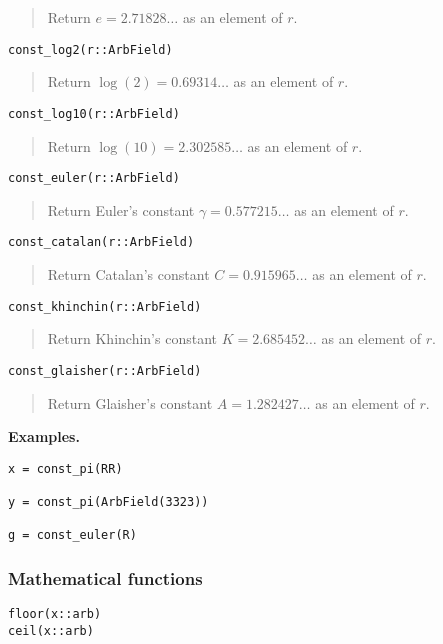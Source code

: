 \documentclass[a4paper,10pt]{article}
\newcommand{\desc}[1]{\vspace{-3mm}\begin{quote}#1\end{quote}}
\begin{document}
{{\desc{Return $e = 2.71828\ldots$ as an element of $r$.}

\begin{lstlisting}
const_log2(r::ArbField)
\end{lstlisting}

\desc{Return $\log(2) = 0.69314\ldots$ as an element of $r$.}

\begin{lstlisting}
const_log10(r::ArbField)
\end{lstlisting}

\desc{Return $\log(10) = 2.302585\ldots$ as an element of $r$.}

\begin{lstlisting}
const_euler(r::ArbField)
\end{lstlisting}

\desc{Return Euler's constant $\gamma = 0.577215\ldots$ as an element of $r$.}

\begin{lstlisting}
const_catalan(r::ArbField)
\end{lstlisting}

\desc{Return Catalan's constant $C = 0.915965\ldots$ as an element of $r$.}

\begin{lstlisting}
const_khinchin(r::ArbField)
\end{lstlisting}

\desc{Return Khinchin's constant $K = 2.685452\ldots$ as an element of $r$.}

\begin{lstlisting}
const_glaisher(r::ArbField)
\end{lstlisting}

\desc{Return Glaisher's constant $A = 1.282427\ldots$ as an element of $r$.}

\textbf{Examples.}

\begin{lstlisting}
x = const_pi(RR)

y = const_pi(ArbField(3323))

g = const_euler(R)
\end{lstlisting}

\subsubsection{Mathematical functions}

\begin{lstlisting}
floor(x::arb)
ceil(x::arb)
\end{lstlisting}

}}
\end{document}

